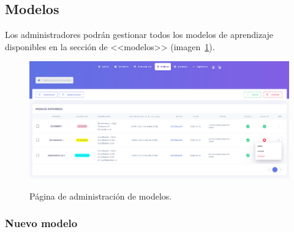 \subsection{Modelos}
\label{s-e:models}

Los administradores podrán gestionar todos los modelos de aprendizaje disponibles en la sección de <<modelos>> (imagen~\ref{e-5:models}).

\begin{figure}[h]
	\caption[Manual de usuario: página de modelos]{Página de administración de modelos.}
	\centering
	\includegraphics[width=\textwidth]{../img/anexos/user_guide/5_models}
	\label{e-5:models}
\end{figure}

\subsubsection{Nuevo modelo}

